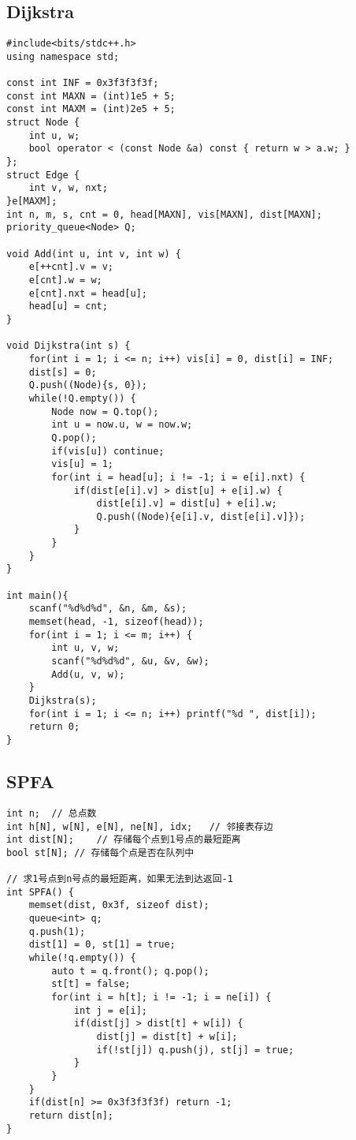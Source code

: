 \subsection{Dijkstra}
\begin{lstlisting}
#include<bits/stdc++.h>
using namespace std;

const int INF = 0x3f3f3f3f;
const int MAXN = (int)1e5 + 5;
const int MAXM = (int)2e5 + 5;
struct Node {
	int u, w;
	bool operator < (const Node &a) const { return w > a.w; } 
};
struct Edge {
	int v, w, nxt;
}e[MAXM];
int n, m, s, cnt = 0, head[MAXN], vis[MAXN], dist[MAXN];
priority_queue<Node> Q;

void Add(int u, int v, int w) {
	e[++cnt].v = v;
	e[cnt].w = w;
	e[cnt].nxt = head[u];
	head[u] = cnt;
}

void Dijkstra(int s) {
	for(int i = 1; i <= n; i++) vis[i] = 0, dist[i] = INF;
	dist[s] = 0;
	Q.push((Node){s, 0});
	while(!Q.empty()) {
		Node now = Q.top();
		int u = now.u, w = now.w;
		Q.pop();
		if(vis[u]) continue;
		vis[u] = 1;
		for(int i = head[u]; i != -1; i = e[i].nxt) {
			if(dist[e[i].v] > dist[u] + e[i].w) {
				dist[e[i].v] = dist[u] + e[i].w;
				Q.push((Node){e[i].v, dist[e[i].v]});
			}
		}
	}
}

int main(){
	scanf("%d%d%d", &n, &m, &s);
	memset(head, -1, sizeof(head));
	for(int i = 1; i <= m; i++) {
		int u, v, w;
		scanf("%d%d%d", &u, &v, &w);
		Add(u, v, w);
	}
	Dijkstra(s);
	for(int i = 1; i <= n; i++) printf("%d ", dist[i]);
	return 0;
}
\end{lstlisting}

\subsection{SPFA}
\begin{lstlisting}
int n;	// 总点数 
int h[N], w[N], e[N], ne[N], idx;	// 邻接表存边 
int dist[N];	// 存储每个点到1号点的最短距离 
bool st[N];	// 存储每个点是否在队列中 

// 求1号点到n号点的最短距离，如果无法到达返回-1 
int SPFA() {
	memset(dist, 0x3f, sizeof dist);
	queue<int> q;
	q.push(1);
	dist[1] = 0, st[1] = true;
	while(!q.empty()) {
		auto t = q.front(); q.pop();
		st[t] = false;
		for(int i = h[t]; i != -1; i = ne[i]) {
			int j = e[i];
			if(dist[j] > dist[t] + w[i]) {
				dist[j] = dist[t] + w[i];
				if(!st[j]) q.push(j), st[j] = true;
			}
		}
	}
	if(dist[n] >= 0x3f3f3f3f) return -1;
	return dist[n];
}
\end{lstlisting}

